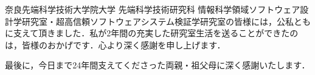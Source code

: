 \documentclass[12pt]{jarticle} %
\begin{document}
奈良先端科学技術大学院大学 先端科学技術研究科 情報科学領域ソフトウェア設計学研究室・超高信頼ソフトウェアシステム検証学研究室の皆様には，公私ともに支えて頂きました．私が2年間の充実した研究室生活を送ることができたのは，皆様のおかげです．心より深く感謝を申し上げます．

最後に，今日まで24年間支えてくださった両親・祖父母に深く感謝いたします．


%
%
\newpage


%
%

\end{document}
